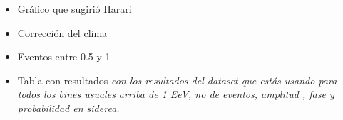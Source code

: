 \begin{itemize}
	\item Gráfico que sugirió Harari

	\item Corrección del clima
	
	\item Eventos entre 0.5 y 1
	
	\item Tabla con resultados \emph{con los resultados del dataset que estás usando para todos los bines usuales arriba de 1 EeV, no de eventos, amplitud , fase y probabilidad en siderea. }
\end{itemize}